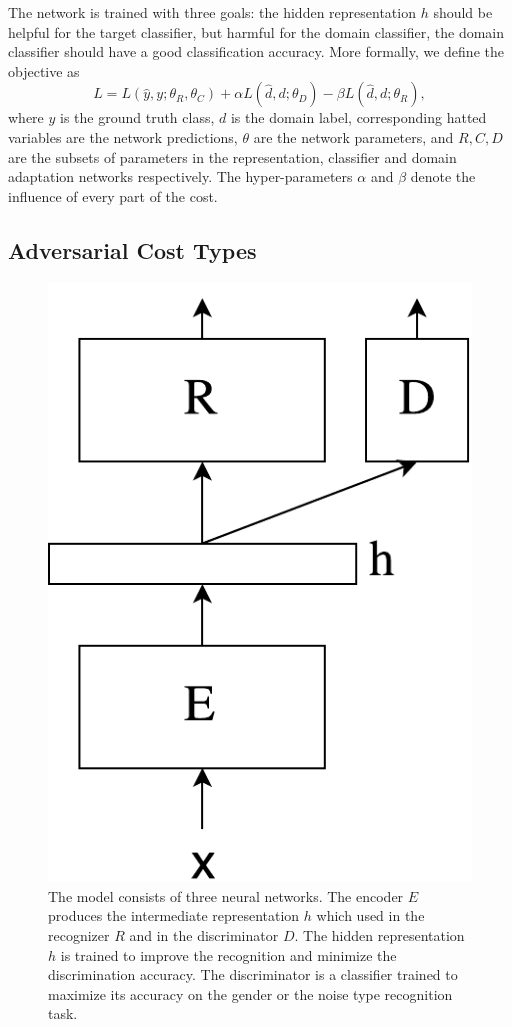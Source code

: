\documentclass{article}
\begin{document}
    The network is trained with three goals: the hidden representation $h$ should
    be helpful for the target classifier, but harmful for the domain classifier,
    the domain classifier should have a good classification accuracy. More 
    formally, we define the objective as
    \begin{equation}
        L = L(\hat{y}, y; \theta_R, \theta_C) + 
        \alpha L(\hat{d}, d; \theta_D) -
        \beta L(\hat{d}, d; \theta_R),
    \end{equation}
    where $y$ is the ground truth class, $d$ is the domain label, corresponding
    hatted variables are the network predictions, $\theta$ are the network 
    parameters, and $R, C, D$ are the subsets of parameters in the representation,
    classifier and domain adaptation networks respectively. The hyper-parameters
    $\alpha$ and $\beta$ denote the influence of every part of the cost.

\subsection{Adversarial Cost Types}


\begin{figure}
    \centering
    \includegraphics[width=0.7\linewidth]{model.pdf}
    \caption{The model consists of three neural networks. The encoder $E$ produces
    the intermediate representation $h$ which used in the recognizer $R$ and 
    in the discriminator $D$. The hidden representation $h$ is trained to improve
    the recognition and minimize the discrimination accuracy. The discriminator
    is a classifier trained to maximize its accuracy on the gender or the noise type
    recognition task.}
    \label{fig:model}
\end{figure}
\end{document}

